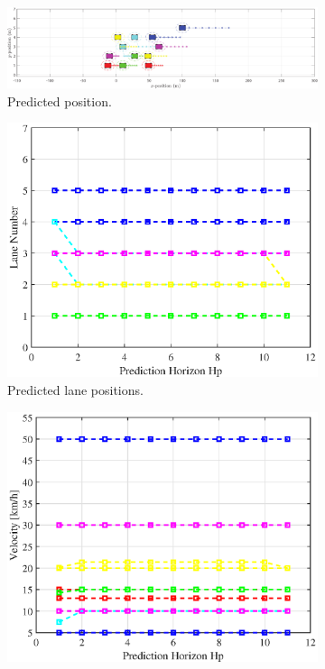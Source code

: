 \begin{figure}[h!]
\centering
\begin{subfigure}[t]{\textwidth}
    \includegraphics[width=\textwidth]{Kap6/no_restricted/no_restricted_traj10.eps}
    \caption{Predicted position.}
    \label{fig:first}
\end{subfigure}
\vspace{1cm}
\begin{subfigure}[b]{0.45\textwidth}
    \includegraphics[width=\textwidth]{Kap6/no_restricted/no_restricted_lane10.eps}
    \caption{Predicted lane positions.}
    \label{fig:second}
\end{subfigure}
\hfill
\begin{subfigure}[b]{0.45\textwidth}
    \includegraphics[width=\textwidth]{Kap6/no_restricted/no_restricted_vel10.eps}

\end{subfigure}
\end{figure}
